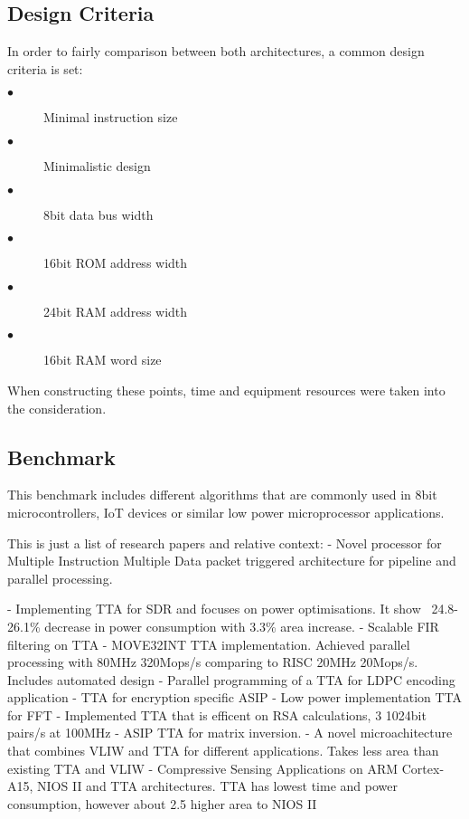 \subsection{Design Criteria}
In order to fairly comparison between both architectures, a common design criteria is set:
\begin{description}
	\item[$\bullet$] Minimal instruction size
	\item[$\bullet$] Minimalistic design
	\item[$\bullet$] 8bit data bus width
	\item[$\bullet$] 16bit ROM address width
	\item[$\bullet$] 24bit RAM address width
	\item[$\bullet$] 16bit RAM word size
\end{description}
When constructing these points, time and equipment resources were taken into the consideration. 

\subsection{Benchmark}
This benchmark includes different algorithms that are commonly used in 8bit microcontrollers, IoT devices or similar low power microprocessor applications.


\iffalse
This is just a list of research papers and relative context:
\autocite{5936440} - Novel processor for Multiple Instruction Multiple Data packet triggered architecture for pipeline and parallel processing.


\autocite{7363689} - Implementing TTA for SDR and focuses on power optimisations. It show ~24.8-26.1\% decrease in power consumption with 3.3\% area increase.
\autocite{1511285} - Scalable FIR filtering on TTA
\autocite{289981} - MOVE32INT TTA implementation. Achieved parallel processing with 80MHz 320Mops/s comparing to RISC 20MHz 20Mops/s. Includes automated design
\autocite{6855236} - Parallel programming of a TTA for LDPC encoding application
\autocite{922340} - TTA for encryption specific ASIP
\autocite{8682289} - Low power implementation TTA for FFT
\autocite{6128530} - Implemented TTA that is efficent on RSA calculations, 3 1024bit pairs/s at 100MHz
\autocite{1540373} - ASIP TTA for matrix inversion.
\autocite{6403142} - A novel microachitecture that combines VLIW and TTA for different applications. Takes less area than existing TTA and VLIW
\autocite{8573494} - Compressive Sensing Applications on ARM Cortex-A15, NIOS II and TTA architectures. TTA has lowest time and power consumption, however about 2.5 higher area to NIOS II

